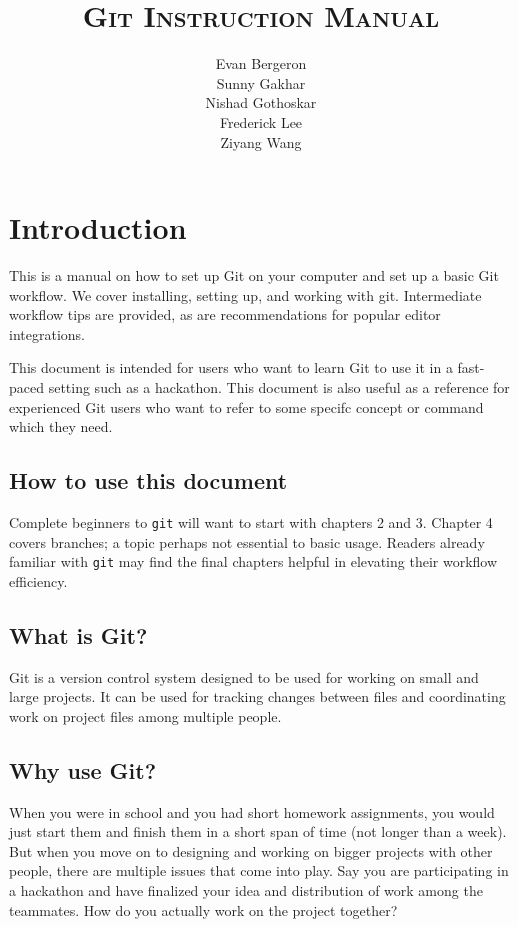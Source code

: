 \documentclass[12pt]{report}
\title{\scshape Git Instruction Manual}
\author{Evan Bergeron\\
Sunny Gakhar\\
Nishad Gothoskar\\
Frederick Lee\\
Ziyang Wang
}
\begin{document}
{\sffamily \maketitle }

\tableofcontents
\newpage
\chapter{Introduction}

This is a manual on how to set up Git on your computer and set up a basic Git workflow. We cover installing, setting up, and working with git. Intermediate workflow tips are provided, as are recommendations for popular editor integrations.

This document is intended for users who want to learn Git to use it in a fast-paced setting such as a hackathon. This document is also useful as a reference for experienced Git users who want to refer to some specifc concept or command which they need.

\section{How to use this document}

Complete beginners to \texttt{git} will want to start with chapters 2 and 3. Chapter 4 covers branches; a topic perhaps not essential to basic usage. Readers already familiar with \texttt{git} may find the final chapters helpful in elevating their workflow efficiency.

\newpage
\section{What is Git?}

Git is a version control system designed to be used for working on small and large projects. It can be used for tracking changes between files and coordinating work on project files among multiple people.

\section{Why use Git?}
When you were in school and you had short homework assignments, you would just start them and finish them in a short span of time (not longer than a week). But when you move on to designing and working on bigger projects with other people, there are multiple issues that come into play. Say you are participating in a hackathon and have finalized your idea and distribution of work among the teammates. How do you actually work on the project together? 
\end{document}
